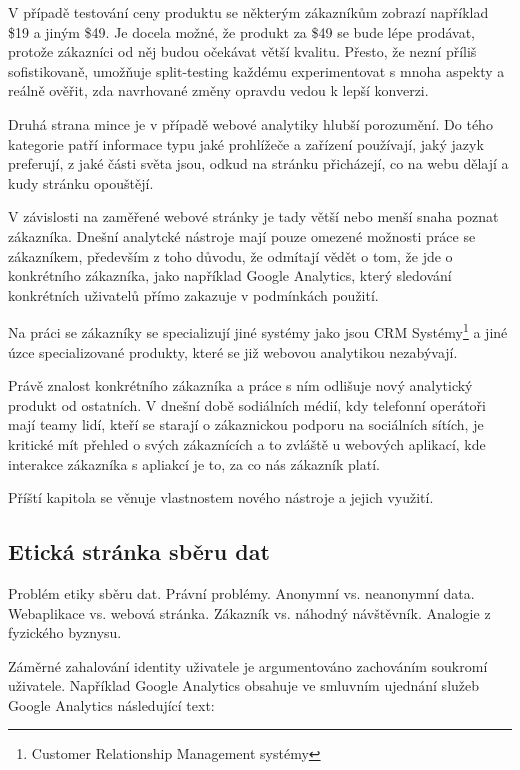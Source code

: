 \documentclass[bc,female,java,dept456]{diploma}						%
\begin{document}
V případě testování ceny produktu se některým zákazníkům zobrazí například \$19 a jiným \$49. Je docela možné, že produkt za \$49 se bude lépe prodávat, protože zákazníci od něj budou očekávat větší kvalitu. Přesto, že nezní příliš sofistikovaně, umožňuje split-testing každému experimentovat s mnoha aspekty a reálně ověřit, zda navrhované změny opravdu vedou k lepší konverzi.




Druhá strana mince je v případě webové analytiky hlubší porozumění. Do tého kategorie patří informace typu jaké prohlížeče a zařízení používají, jaký jazyk preferují, z jaké části světa jsou, odkud na stránku přicházejí, co na webu dělají a kudy stránku opouštějí. 

V závislosti na zaměřené webové stránky je tady větší nebo menší snaha poznat zákazníka. Dnešní analytcké nástroje mají pouze omezené možnosti práce se zákazníkem, především z toho důvodu, že odmítají vědět o tom, že jde o konkrétního zákazníka, jako například Google Analytics, který sledování konkrétních uživatelů přímo zakazuje v podmínkách použití.

Na práci se zákazníky se specializují jiné systémy jako jsou CRM Systémy\footnote{Customer Relationship Management systémy} a jiné úzce specializované produkty, které se již webovou analytikou nezabývají. 

Právě znalost konkrétního zákazníka a práce s ním odlišuje nový analytický produkt od ostatních. V dnešní době sodiálních médií, kdy telefonní operátoři mají teamy lidí, kteří se starají o zákaznickou podporu na sociálních sítích, je kritické mít přehled o svých zákaznících a to zvláště u webových aplikací, kde interakce zákazníka s apliakcí je to, za co nás zákazník platí.

Příští kapitola se věnuje vlastnostem nového nástroje a jejich využití.





\subsection{Etická stránka sběru dat}

Problém etiky sběru dat.
Právní problémy.
Anonymní vs. neanonymní data.
Webaplikace vs. webová stránka.
Zákazník vs. náhodný návštěvník.
Analogie z fyzického byznysu.


Záměrné zahalování identity uživatele je argumentováno zachováním soukromí uživatele. Například Google Analytics obsahuje ve smluvním ujednání služeb Google Analytics následující text:
\end{document}
